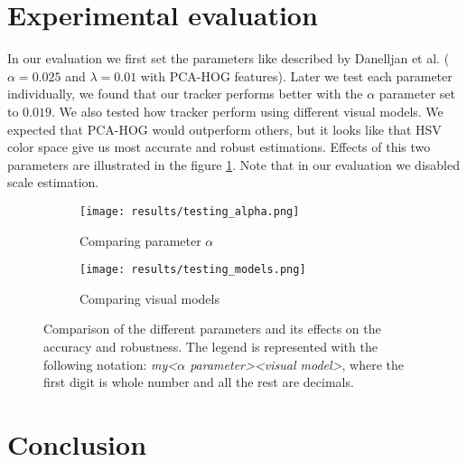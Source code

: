 \documentclass[runningheads]{llncs}
\begin{document}
\newpage
\section{Experimental evaluation}
\label{sec:experimental_evaluation}

In our evaluation we first set the parameters like described by Danelljan et al. \cite{danelljan2014accurate} ($\alpha=0.025$ and $\lambda=0.01$ with PCA-HOG features). Later we test each parameter individually, we found that our tracker performs better with the $\alpha$ parameter set to $0.019$. We also tested how tracker perform using different visual models. We expected that PCA-HOG would outperform others, but it looks like that HSV color space give us most accurate and robust estimations. Effects of this two parameters are illustrated in the figure \ref{fig:parameters}. Note that in our evaluation we disabled scale estimation.

\begin{figure}[H]
    \centering

    \begin{subfigure}{0.48\textwidth}
        \centering
        \texttt{[image: results/testing\_alpha.png]}
        \caption{Comparing parameter $\alpha$}
    \end{subfigure}
    \hspace*{\fill}
    \begin{subfigure}{0.48\textwidth}
        \centering
        \texttt{[image: results/testing\_models.png]}
        \caption{Comparing visual models}
    \end{subfigure}
    
    \caption{Comparison of the different parameters and its effects on the accuracy and robustness.
    \newline
    \newline
    The legend is represented with the following notation: \newline
    \textit{my\textunderscore\textless $\alpha$ parameter\textgreater\textunderscore\textless visual model\textgreater}, where the first digit is whole number and all the rest are decimals.}
    \label{fig:parameters}
\end{figure}


\section{Conclusion}



\end{document}
